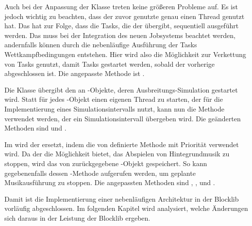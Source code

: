 Auch bei der Anpassung der Klasse \classEventManager{} treten keine größeren Probleme auf. Es ist jedoch wichtig zu beachten, dass der zuvor genutzte \classExecutorService{} genau einen Thread genutzt hat. Das hat zur Folge, dass die Tasks, die der \classEventManager{} übergibt, sequentiell ausgeführt werden. Das muss bei der Integration des neuen Jobsystems beachtet werden, andernfalls können durch die nebenläufige Ausführung der Tasks Wettkampfbedingungen entstehen. Hier wird also die Möglichkeit zur Verkettung von Tasks genutzt, damit Tasks gestartet werden, sobald der vorherige abgeschlossen ist. Die angepasste Methode ist .

Die Klasse \classFluidManager{} übergibt den \classBlocklibExecutor{} an \classFluid{}-Objekte, deren Aus\-brei\-tungs-Si\-mu\-la\-ti\-on gestartet wird. Statt für jedes \classFluid{}-Objekt einen eigenen Thread zu starten, der  für die Implementierung eines Simulationsintervalls nutzt, kann nun die Methode  verwendet werden, der ein Simulationsintervall übergeben wird. Die geänderten Methoden sind  und .

Im \classAudioManager{} wird der \classTimer{} ersetzt, indem die von \classBlocklibExecutorService{} definierte Methode  mit Priorität  verwendet wird. Da der \classAudioManager{} die Möglichkeit bietet, das Abspielen von Hintegrundmusik zu stoppen, wird das von  zurückgegebene \classFuture{}-Objekt gespeichert. So kann gegebenenfalls dessen -Methode aufgerufen werden, um geplante Musikausführung zu stoppen. Die angepassten Methoden sind , ,  und .

Damit ist die Implementierung einer nebenläufigen Architektur in der Blocklib vorläufig abgeschlossen. Im folgenden Kapitel wird analysiert, welche Änderungen sich daraus in der Leistung der Blocklib ergeben.